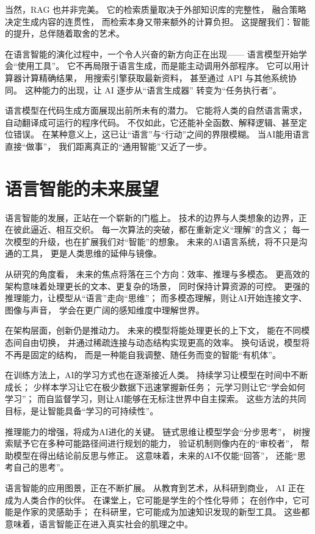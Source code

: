 当然，RAG 也并非完美。  
它的检索质量取决于外部知识库的完整性，  
融合策略决定生成内容的连贯性，  
而检索本身又带来额外的计算负担。  
这提醒我们：智能的提升，总伴随着取舍的艺术。  

在语言智能的演化过程中，一个令人兴奋的新方向正在出现——  
语言模型开始学会“使用工具”。  
它不再局限于语言生成，而是能主动调用外部程序。  
它可以用计算器计算精确结果，  
用搜索引擎获取最新资料，  
甚至通过 API 与其他系统协同。  
这种能力的出现，让 AI 逐步从“语言生成器”  
转变为“任务执行者”。  

语言模型在代码生成方面展现出前所未有的潜力。  
它能将人类的自然语言需求，  
自动翻译成可运行的程序代码。  
不仅如此，它还能补全函数、解释逻辑、甚至定位错误。  
在某种意义上，这已让“语言”与“行动”之间的界限模糊。  
当AI能用语言直接“做事”，  
我们距离真正的“通用智能”又近了一步。  

\section{语言智能的未来展望}

语言智能的发展，正站在一个崭新的门槛上。  
技术的边界与人类想象的边界，正在彼此逼近、相互交织。  
每一次算法的突破，都在重新定义“理解”的含义；  
每一次模型的升级，也在扩展我们对“智能”的想象。  
未来的AI语言系统，将不只是沟通的工具，  
更是人类思维的延伸与镜像。  

从研究的角度看，  
未来的焦点将落在三个方向：效率、推理与多模态。  
更高效的架构意味着处理更长的文本、更复杂的场景，  
同时保持计算资源的可控。  
更强的推理能力，让模型从“语言”走向“思维”；  
而多模态理解，则让AI开始连接文字、图像与声音，  
学会在更广阔的感知维度中理解世界。  

在架构层面，创新仍是推动力。  
未来的模型将能处理更长的上下文，  
能在不同模态间自由切换，  
并通过稀疏连接与动态结构实现更高的效率。  
换句话说，模型将不再是固定的结构，  
而是一种能自我调整、随任务而变的智能“有机体”。  

在训练方法上，AI的学习方式也在逐渐接近人类。  
持续学习让模型在时间中不断成长；  
少样本学习让它在极少数据下迅速掌握新任务；  
元学习则让它“学会如何学习”；  
而自监督学习，则让AI能够在无标注世界中自主探索。  
这些方法的共同目标，是让智能具备“学习的可持续性”。  

推理能力的增强，将成为AI进化的关键。  
链式思维让模型学会“分步思考”，  
树搜索赋予它在多种可能路径间进行规划的能力，  
验证机制则像内在的“审校者”，  
帮助模型在得出结论前反思与修正。  
这意味着，未来的AI不仅能“回答”，  
还能“思考自己的思考”。  

语言智能的应用图景，正在不断扩展。  
从教育到艺术，从科研到商业，  
AI 正在成为人类合作的伙伴。  
在课堂上，它可能是学生的个性化导师；  
在创作中，它可能是作家的灵感助手；  
在科研里，它可能成为加速知识发现的新型工具。  
这些都意味着，语言智能正在进入真实社会的肌理之中。  

